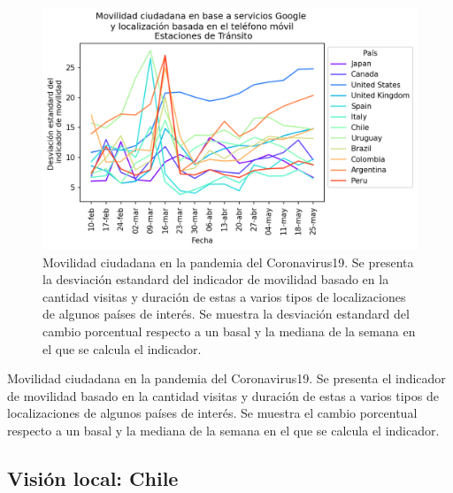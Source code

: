 \documentclass{article}
\begin{document}
\begin{figure}[H]
	\centering
	\begin{adjustbox}{width=0.8\textwidth}
		\includegraphics{./mundo_DS.png} %
	\end{adjustbox}
	\caption{Movilidad ciudadana en la pandemia del Coronavirus19. Se presenta la desviación estandard del indicador de movilidad basado en la cantidad visitas y duración de estas a varios tipos de localizaciones de algunos países de interés. Se muestra la desviación estandard del cambio porcentual respecto a un basal y la mediana de la semana en el que se calcula el indicador. }
	\label{fig:movilidad mundial_DS}
\end{figure}


\begin{table}[H]
	\begin{adjustbox}{width=1\textwidth}
	\end{adjustbox}
	\caption{Movilidad ciudadana en la pandemia del Coronavirus19. Se presenta el indicador de movilidad basado en la cantidad visitas y duración de estas a varios tipos de localizaciones de algunos países de interés. Se muestra el cambio porcentual respecto a un basal y la mediana de la semana en el que se calcula el indicador. }
	\label{tab:movilidad mundial_DS}
\end{table}

\subsection{Visión local: Chile}
\end{document}
